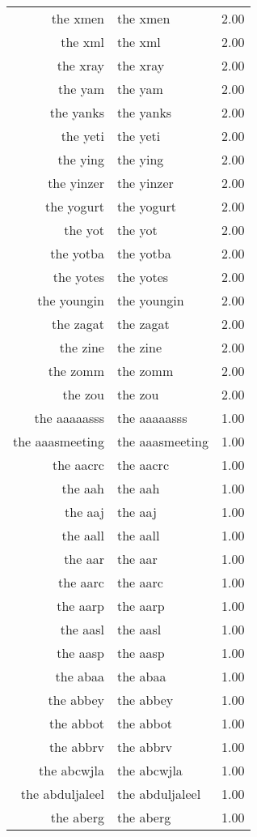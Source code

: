 \begin{table}[ht]
\begin{tabular}{rlr}
  the xmen & the xmen & 2.00 \\ 
  the xml & the xml & 2.00 \\ 
  the xray & the xray & 2.00 \\ 
  the yam & the yam & 2.00 \\ 
  the yanks & the yanks & 2.00 \\ 
  the yeti & the yeti & 2.00 \\ 
  the ying & the ying & 2.00 \\ 
  the yinzer & the yinzer & 2.00 \\ 
  the yogurt & the yogurt & 2.00 \\ 
  the yot & the yot & 2.00 \\ 
  the yotba & the yotba & 2.00 \\ 
  the yotes & the yotes & 2.00 \\ 
  the youngin & the youngin & 2.00 \\ 
  the zagat & the zagat & 2.00 \\ 
  the zine & the zine & 2.00 \\ 
  the zomm & the zomm & 2.00 \\ 
  the zou & the zou & 2.00 \\ 
  the aaaaasss & the aaaaasss & 1.00 \\ 
  the aaasmeeting & the aaasmeeting & 1.00 \\ 
  the aacrc & the aacrc & 1.00 \\ 
  the aah & the aah & 1.00 \\ 
  the aaj & the aaj & 1.00 \\ 
  the aall & the aall & 1.00 \\ 
  the aar & the aar & 1.00 \\ 
  the aarc & the aarc & 1.00 \\ 
  the aarp & the aarp & 1.00 \\ 
  the aasl & the aasl & 1.00 \\ 
  the aasp & the aasp & 1.00 \\ 
  the abaa & the abaa & 1.00 \\ 
  the abbey & the abbey & 1.00 \\ 
  the abbot & the abbot & 1.00 \\ 
  the abbrv & the abbrv & 1.00 \\ 
  the abcwjla & the abcwjla & 1.00 \\ 
  the abduljaleel & the abduljaleel & 1.00 \\ 
  the aberg & the aberg & 1.00 \\ 

\end{tabular}
\end{table}
